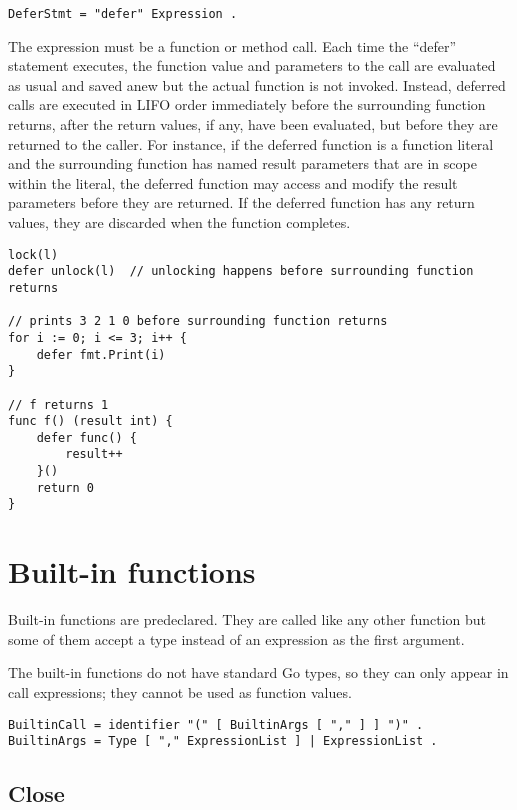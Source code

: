 {\begin{Verbatim}[frame=single]
DeferStmt = "defer" Expression .
\end{Verbatim}

The expression must be a function or method call. Each time the
``defer'' statement executes, the function value and parameters to the
call are evaluated as usual and saved anew but the
actual function is not invoked. Instead, deferred calls are executed in
LIFO order immediately before the surrounding function returns, after
the return values, if any, have been evaluated, but before they are
returned to the caller. For instance, if the deferred function is a
function literal and the surrounding
function has named result parameters that
are in scope within the literal, the deferred function may access and
modify the result parameters before they are returned. If the deferred
function has any return values, they are discarded when the function
completes.

\begin{Verbatim}[frame=single]
lock(l)
defer unlock(l)  // unlocking happens before surrounding function returns

// prints 3 2 1 0 before surrounding function returns
for i := 0; i <= 3; i++ {
    defer fmt.Print(i)
}

// f returns 1
func f() (result int) {
    defer func() {
        result++
    }()
    return 0
}
\end{Verbatim}

\section*{Built-in functions}

Built-in functions are predeclared.
They are called like any other function but some of them accept a type
instead of an expression as the first argument.

The built-in functions do not have standard Go types, so they can only
appear in call expressions; they cannot be used as
function values.

\begin{Verbatim}[frame=single]
BuiltinCall = identifier "(" [ BuiltinArgs [ "," ] ] ")" .
BuiltinArgs = Type [ "," ExpressionList ] | ExpressionList .
\end{Verbatim}

\subsection*{Close}

}
